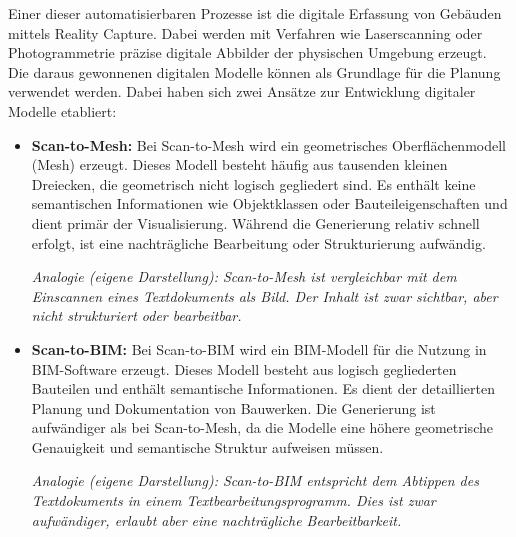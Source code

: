 \begin{German}
    Einer dieser automatisierbaren Prozesse ist die digitale Erfassung von Gebäuden mittels Reality Capture. Dabei werden mit Verfahren wie Laserscanning oder Photogrammetrie präzise digitale Abbilder der physischen Umgebung erzeugt. Die daraus gewonnenen digitalen Modelle können als Grundlage für die Planung verwendet werden. Dabei haben sich zwei Ansätze zur Entwicklung digitaler Modelle etabliert:

    \begin{itemize}
        \item \textbf{Scan-to-Mesh:} Bei Scan-to-Mesh wird ein geometrisches Oberflächenmodell (Mesh) erzeugt. Dieses Modell besteht häufig aus tausenden kleinen Dreiecken, die geometrisch nicht logisch gegliedert sind. Es enthält keine semantischen Informationen wie Objektklassen oder Bauteileigenschaften und dient primär der Visualisierung. Während die Generierung relativ schnell erfolgt, ist eine nachträgliche Bearbeitung oder Strukturierung aufwändig. \cite{daiScan2MeshUnstructuredRange2019}
        
        \textit{Analogie (eigene Darstellung): Scan-to-Mesh ist vergleichbar mit dem Einscannen eines Textdokuments als Bild. Der Inhalt ist zwar sichtbar, aber nicht strukturiert oder bearbeitbar.}

        \item \textbf{Scan-to-BIM:} Bei Scan-to-BIM wird ein BIM-Modell für die Nutzung in BIM-Software erzeugt. Dieses Modell besteht aus logisch gegliederten Bauteilen und enthält semantische Informationen. Es dient der detaillierten Planung und Dokumentation von Bauwerken. Die Generierung ist aufwändiger als bei Scan-to-Mesh, da die Modelle eine höhere geometrische Genauigkeit und semantische Struktur aufweisen müssen. \cite{eichlerBIMcertHandbuchGrundlagenwissen2023}
        
        \textit{Analogie (eigene Darstellung): Scan-to-BIM entspricht dem Abtippen des Textdokuments in einem Textbearbeitungsprogramm. Dies ist zwar aufwändiger, erlaubt aber eine nachträgliche Bearbeitbarkeit.} 
    \end{itemize}
\end{German}


